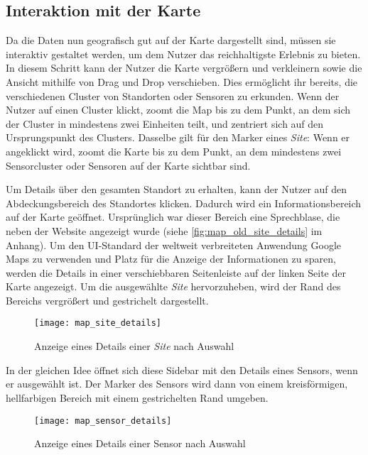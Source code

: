 \subsection{Interaktion mit der Karte}

Da die Daten nun geografisch gut auf der Karte dargestellt sind, müssen sie interaktiv gestaltet werden, um dem Nutzer das reichhaltigste Erlebnis zu bieten.
In diesem Schritt kann der Nutzer die Karte vergrößern und verkleinern sowie die Ansicht mithilfe von Drag und Drop verschieben.
Dies ermöglicht ihr bereits, die verschiedenen Cluster von Standorten oder Sensoren zu erkunden.
Wenn der Nutzer auf einen Cluster klickt, zoomt die Map bis zu dem Punkt, an dem sich der Cluster in mindestens zwei Einheiten teilt, und zentriert sich auf den Ursprungspunkt des Clusters.
Dasselbe gilt für den Marker eines \textit{Site}: Wenn er angeklickt wird, zoomt die Karte bis zu dem Punkt, an dem mindestens zwei Sensorcluster oder Sensoren auf der Karte sichtbar sind.

Um Details über den gesamten Standort zu erhalten, kann der Nutzer auf den Abdeckungsbereich des Standortes klicken.
Dadurch wird ein Informationsbereich auf der Karte geöffnet.
Ursprünglich war dieser Bereich eine Sprechblase, die neben der Website angezeigt wurde (siehe \ref{fig:map_old_site_details} im Anhang).
Um den UI-Standard der weltweit verbreiteten Anwendung Google Maps zu verwenden und Platz für die Anzeige der Informationen zu sparen, werden die Details in einer verschiebbaren Seitenleiste auf der linken Seite der Karte angezeigt.
Um die ausgewählte \textit{Site} hervorzuheben, wird der Rand des Bereichs vergrößert und gestrichelt dargestellt.

\begin{figure}[H]
  \centering
  \texttt{[image: map\_site\_details]}
  \caption{Anzeige eines Details einer \textit{Site} nach Auswahl}
  \label{fig:map_site_details}
\end{figure}

In der gleichen Idee öffnet sich diese Sidebar mit den Details eines Sensors, wenn er ausgewählt ist.
Der Marker des Sensors wird dann von einem kreisförmigen, hellfarbigen Bereich mit einem gestrichelten Rand umgeben.

\begin{figure}[H]
  \centering
  \texttt{[image: map\_sensor\_details]}
  \caption{Anzeige eines Details einer Sensor nach Auswahl}
  \label{fig:map_sensor_details}
\end{figure}
